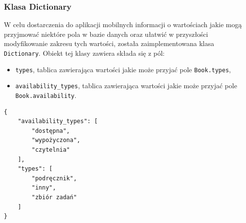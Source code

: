 \documentclass[twoside]{projektInzynierskiMS}
\begin{document}
\subsubsection{Klasa Dictionary}
W celu dostarczenia do aplikacji mobilnych informacji o wartościach jakie mogą przyjmować niektóre pola w bazie danych oraz ułatwić w przyszłości modyfikowanie zakresu tych wartości, została zaimplementowana klasa \verb`Dictionary`. Obiekt tej klasy zawiera składa się z pól:
\begin{itemize}
	\item \verb`types`, tablica zawierająca wartości jakie może przyjać pole \verb`Book.types`,
	\item \verb`availability_types`, tablica zawierająca wartości jakie może przyjać pole \verb`Book.availability`.
\end{itemize}


\begin{verbatim}
{
    "availability_types": [
        "dostępna",
        "wypożyczona",
        "czytelnia"
    ],
    "types": [
        "podręcznik",
        "inny",
        "zbiór zadań"
    ]
}
\end{verbatim}
\end{document}
